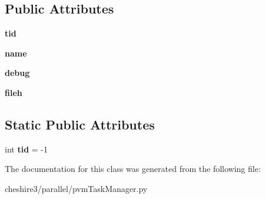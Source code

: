 \subsection*{Public Attributes}
\begin{DoxyCompactItemize}
\item 
\hypertarget{classcheshire3_1_1parallel_1_1pvm_task_manager_1_1_task_ab1de3464085a8a67cf6ef613580d7171}{{\bfseries tid}}\label{classcheshire3_1_1parallel_1_1pvm_task_manager_1_1_task_ab1de3464085a8a67cf6ef613580d7171}

\item 
\hypertarget{classcheshire3_1_1parallel_1_1pvm_task_manager_1_1_task_ab5856f59af0c0f688f0872a763a1a211}{{\bfseries name}}\label{classcheshire3_1_1parallel_1_1pvm_task_manager_1_1_task_ab5856f59af0c0f688f0872a763a1a211}

\item 
\hypertarget{classcheshire3_1_1parallel_1_1pvm_task_manager_1_1_task_ad58af20a84c89067570704d520812021}{{\bfseries debug}}\label{classcheshire3_1_1parallel_1_1pvm_task_manager_1_1_task_ad58af20a84c89067570704d520812021}

\item 
\hypertarget{classcheshire3_1_1parallel_1_1pvm_task_manager_1_1_task_aebd2811c43b8b090a9d521b797acbf69}{{\bfseries fileh}}\label{classcheshire3_1_1parallel_1_1pvm_task_manager_1_1_task_aebd2811c43b8b090a9d521b797acbf69}

\end{DoxyCompactItemize}
\subsection*{Static Public Attributes}
\begin{DoxyCompactItemize}
\item 
\hypertarget{classcheshire3_1_1parallel_1_1pvm_task_manager_1_1_task_adbb0d3905b91e37eedcc16a71c29d42c}{int {\bfseries tid} = -\/1}\label{classcheshire3_1_1parallel_1_1pvm_task_manager_1_1_task_adbb0d3905b91e37eedcc16a71c29d42c}

\end{DoxyCompactItemize}


The documentation for this class was generated from the following file\-:\begin{DoxyCompactItemize}
\item 
cheshire3/parallel/pvm\-Task\-Manager.\-py\end{DoxyCompactItemize}
